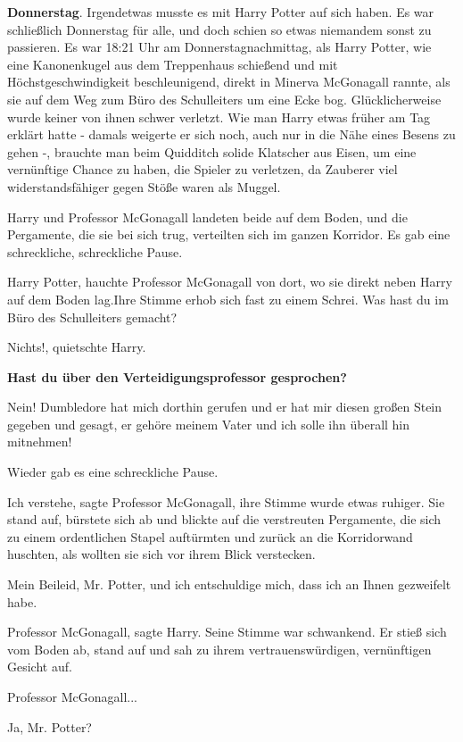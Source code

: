 \textbf{Donnerstag}. Irgendetwas musste es mit Harry Potter auf sich haben. Es
war schließlich Donnerstag für alle, und doch schien so etwas niemandem sonst zu
passieren. Es war 18:21 Uhr am Donnerstagnachmittag, als Harry Potter, wie eine
Kanonenkugel aus dem Treppenhaus schießend und mit Höchstgeschwindigkeit
beschleunigend, direkt in Minerva McGonagall rannte, als sie auf dem Weg zum
Büro des Schulleiters um eine Ecke bog. Glücklicherweise wurde keiner von ihnen
schwer verletzt. Wie man Harry etwas früher am Tag erklärt hatte - damals
weigerte er sich noch, auch nur in die Nähe eines Besens zu gehen -, brauchte
man beim Quidditch solide Klatscher aus Eisen, um eine vernünftige Chance zu
haben, die Spieler zu verletzen, da Zauberer viel widerstandsfähiger gegen Stöße
waren als Muggel.

Harry und Professor McGonagall landeten beide auf dem Boden, und die Pergamente,
die sie bei sich trug, verteilten sich im ganzen Korridor. Es gab eine
schreckliche, schreckliche Pause.

\glqq Harry Potter\grqq{}, hauchte Professor McGonagall von dort, wo sie direkt
neben Harry auf dem Boden lag.Ihre Stimme erhob sich fast zu einem Schrei. \glqq
Was hast du im Büro des Schulleiters gemacht?\grqq{}

\glqq Nichts!\grqq{}, quietschte Harry.

\textbf{\glqq Hast du über den Verteidigungsprofessor gesprochen?\grqq{}}

\glqq Nein! Dumbledore hat mich dorthin gerufen und er hat mir diesen großen
Stein gegeben und gesagt, er gehöre meinem Vater und ich solle ihn überall hin
mitnehmen!\grqq{}

Wieder gab es eine schreckliche Pause.

\glqq Ich verstehe\grqq{}, sagte Professor McGonagall, ihre Stimme wurde etwas
ruhiger. Sie stand auf, bürstete sich ab und blickte auf die verstreuten
Pergamente, die sich zu einem ordentlichen Stapel auftürmten und zurück an die
Korridorwand huschten, als wollten sie sich vor ihrem Blick verstecken.

\glqq Mein Beileid, Mr. Potter, und ich entschuldige mich, dass ich an Ihnen
gezweifelt habe.\grqq{}

\glqq Professor McGonagall\grqq{}, sagte Harry. Seine Stimme war schwankend. Er
stieß sich vom Boden ab, stand auf und sah zu ihrem vertrauenswürdigen,
vernünftigen Gesicht auf.

\glqq Professor McGonagall...\grqq{}

\glqq Ja, Mr. Potter?\grqq{}

